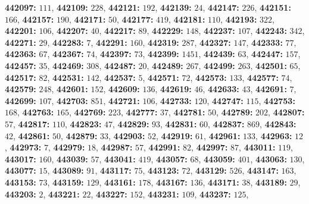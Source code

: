 \textsf{\bfseries 442097:} $111$, \textsf{\bfseries 442109:} $228$, \textsf{\bfseries 442121:} $192$, \textsf{\bfseries 442139:} $24$, \textsf{\bfseries 442147:} $226$, \textsf{\bfseries 442151:} $166$, \textsf{\bfseries 442157:} $190$, \textsf{\bfseries 442171:} $50$, \textsf{\bfseries 442177:} $419$, \textsf{\bfseries 442181:} $110$, \textsf{\bfseries 442193:} $322$, \textsf{\bfseries 442201:} $106$, \textsf{\bfseries 442207:} $40$, \textsf{\bfseries 442217:} $89$, \textsf{\bfseries 442229:} $148$, \textsf{\bfseries 442237:} $107$, \textsf{\bfseries 442243:} $342$, \textsf{\bfseries 442271:} $29$, \textsf{\bfseries 442283:} $7$, \textsf{\bfseries 442291:} $160$, \textsf{\bfseries 442319:} $287$, \textsf{\bfseries 442327:} $147$, \textsf{\bfseries 442333:} $77$, \textsf{\bfseries 442363:} $67$, \textsf{\bfseries 442367:} $74$, \textsf{\bfseries 442397:} $73$, \textsf{\bfseries 442399:} $1451$, \textsf{\bfseries 442439:} $63$, \textsf{\bfseries 442447:} $157$, \textsf{\bfseries 442457:} $35$, \textsf{\bfseries 442469:} $308$, \textsf{\bfseries 442487:} $20$, \textsf{\bfseries 442489:} $267$, \textsf{\bfseries 442499:} $263$, \textsf{\bfseries 442501:} $65$, \textsf{\bfseries 442517:} $82$, \textsf{\bfseries 442531:} $142$, \textsf{\bfseries 442537:} $5$, \textsf{\bfseries 442571:} $72$, \textsf{\bfseries 442573:} $133$, \textsf{\bfseries 442577:} $74$, \textsf{\bfseries 442579:} $248$, \textsf{\bfseries 442601:} $152$, \textsf{\bfseries 442609:} $136$, \textsf{\bfseries 442619:} $46$, \textsf{\bfseries 442633:} $43$, \textsf{\bfseries 442691:} $7$, \textsf{\bfseries 442699:} $107$, \textsf{\bfseries 442703:} $851$, \textsf{\bfseries 442721:} $106$, \textsf{\bfseries 442733:} $120$, \textsf{\bfseries 442747:} $115$, \textsf{\bfseries 442753:} $168$, \textsf{\bfseries 442763:} $165$, \textsf{\bfseries 442769:} $223$, \textsf{\bfseries 442777:} $37$, \textsf{\bfseries 442781:} $50$, \textsf{\bfseries 442789:} $202$, \textsf{\bfseries 442807:} $57$, \textsf{\bfseries 442817:} $110$, \textsf{\bfseries 442823:} $47$, \textsf{\bfseries 442829:} $93$, \textsf{\bfseries 442831:} $60$, \textsf{\bfseries 442837:} $869$, \textsf{\bfseries 442843:} $42$, \textsf{\bfseries 442861:} $50$, \textsf{\bfseries 442879:} $33$, \textsf{\bfseries 442903:} $52$, \textsf{\bfseries 442919:} $61$, \textsf{\bfseries 442961:} $133$, \textsf{\bfseries 442963:} $12$, \textsf{\bfseries 442973:} $7$, \textsf{\bfseries 442979:} $18$, \textsf{\bfseries 442987:} $57$, \textsf{\bfseries 442991:} $82$, \textsf{\bfseries 442997:} $87$, \textsf{\bfseries 443011:} $119$, \textsf{\bfseries 443017:} $160$, \textsf{\bfseries 443039:} $57$, \textsf{\bfseries 443041:} $419$, \textsf{\bfseries 443057:} $68$, \textsf{\bfseries 443059:} $401$, \textsf{\bfseries 443063:} $130$, \textsf{\bfseries 443077:} $15$, \textsf{\bfseries 443089:} $91$, \textsf{\bfseries 443117:} $75$, \textsf{\bfseries 443123:} $72$, \textsf{\bfseries 443129:} $526$, \textsf{\bfseries 443147:} $163$, \textsf{\bfseries 443153:} $73$, \textsf{\bfseries 443159:} $129$, \textsf{\bfseries 443161:} $178$, \textsf{\bfseries 443167:} $136$, \textsf{\bfseries 443171:} $38$, \textsf{\bfseries 443189:} $29$, \textsf{\bfseries 443203:} $2$, \textsf{\bfseries 443221:} $22$, \textsf{\bfseries 443227:} $152$, \textsf{\bfseries 443231:} $109$, \textsf{\bfseries 443237:} $125$, 

